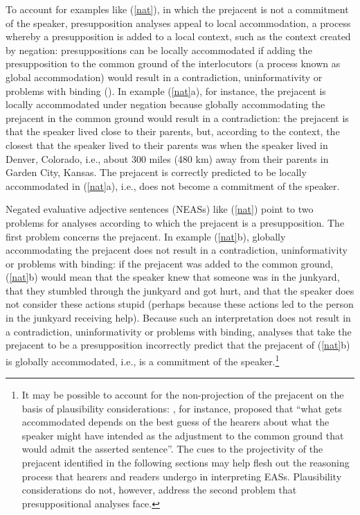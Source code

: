 \documentclass[11pt,fleqn]{article}
\newcommand{\6}{\mbox{$[\hspace*{-.6mm}[$}}
\newcommand{\9}{\mbox{$]\hspace*{-.6mm}]$}}
\begin{document}
To account for examples like (\ref{nat}), in which the prejacent is not a commitment of the speaker, presupposition analyses appeal to local accommodation, a process whereby a presupposition is added to a local context, such as the context created by negation: presuppositions can be locally accommodated if adding the presupposition to the common ground of the interlocutors (a process known as global accommodation) would result in a contradiction, uninformativity or problems with
binding (\citealt{heim82,vds92}). In example (\ref{nat}a), for instance, the prejacent is locally accommodated under negation because globally accommodating the prejacent in the common ground would result in a contradiction: the prejacent is that the speaker lived close to their parents, but, according to the context, the closest that the speaker lived to their parents was when the speaker lived in Denver, Colorado, i.e., about 300 miles (480 km) away from their parents in Garden City, Kansas. The prejacent is correctly predicted to be locally accommodated in (\ref{nat}a), i.e., does not become a commitment of the speaker.

Negated evaluative adjective sentences (NEASs) like (\ref{nat}) point to two problems for analyses according to which the prejacent is a presupposition. The first problem concerns the prejacent. In example (\ref{nat}b), globally accommodating the prejacent does not result in a contradiction, uninformativity or problems with
binding: if the prejacent was added to the common ground,
(\ref{nat}b) would mean that the speaker knew that someone was in the
junkyard, that they stumbled through the junkyard and got hurt, and that
the speaker does not consider these actions stupid (perhaps because these actions
led to the person in the junkyard receiving help). Because such an interpretation does not result in a contradiction, uninformativity or problems with
binding, analyses that take the prejacent to be a presupposition incorrectly  predict that the prejacent of (\ref{nat}b) is globally accommodated, i.e., is a commitment of the speaker.\footnote{It may be possible to account for the non-projection of the prejacent on the basis of plausibility considerations: \citealt[162]{vonfintel08}, for instance,  proposed that ``what gets accommodated depends on the best guess of the hearers about what the speaker might have intended as the adjustment to the common ground that would admit the asserted sentence''. The cues to the projectivity of the prejacent identified in the following sections may help flesh out the reasoning process that hearers and readers undergo in interpreting EASs. Plausibility considerations do not, however, address the second problem that presuppositional analyses face.}
\end{document}
